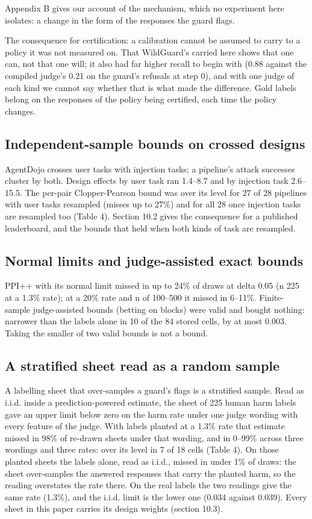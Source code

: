 \documentclass[11pt]{article}
\begin{document}
Appendix B gives our account of the mechanism, which no experiment here isolates: a change in the form of the responses the guard flags.


The consequence for certification: a calibration cannot be assumed to carry to a policy it was not measured on. That WildGuard's carried here shows that one can, not that one will; it also had far higher recall to begin with (0.88 against the compiled judge's 0.21 on the guard's refusals at step 0), and with one judge of each kind we cannot say whether that is what made the difference. Gold labels belong on the responses of the policy being certified, each time the policy changes.


\subsection{Independent-sample bounds on crossed designs}

AgentDojo crosses user tasks with injection tasks; a pipeline's attack successes cluster by both. Design effects by user task ran 1.4--8.7 and by injection task 2.6--15.5. The per-pair Clopper-Pearson bound was over its level for 27 of 28 pipelines with user tasks resampled (misses up to 27\%) and for all 28 once injection tasks are resampled too (Table 4). Section 10.2 gives the consequence for a published leaderboard, and the bounds that held when both kinds of task are resampled.


\subsection{Normal limits and judge-assisted exact bounds}

PPI++ with its normal limit missed in up to 24\% of draws at delta 0.05 (n 225 at a 1.3\% rate); at a 20\% rate and n of 100--500 it missed in 6--11\%. Finite-sample judge-assisted bounds (betting on blocks) were valid and bought nothing: narrower than the labels alone in 10 of the 84 stored cells, by at most 0.003. Taking the smaller of two valid bounds is not a bound.


\subsection{A stratified sheet read as a random sample}

A labelling sheet that over-samples a guard's flags is a stratified sample. Read as i.i.d. inside a prediction-powered estimate, the sheet of 225 human harm labels gave an upper limit below zero on the harm rate under one judge wording with every feature of the judge. With labels planted at a 1.3\% rate that estimate missed in 98\% of re-drawn sheets under that wording, and in 0--99\% across three wordings and three rates: over its level in 7 of 18 cells (Table 4). On those planted sheets the labels alone, read as i.i.d., missed in under 1\% of draws: the sheet over-samples the answered responses that carry the planted harm, so the reading overstates the rate there. On the real labels the two readings give the same rate (1.3\%), and the i.i.d. limit is the lower one (0.034 against 0.039). Every sheet in this paper carries its design weights (section 10.3).
\end{document}
